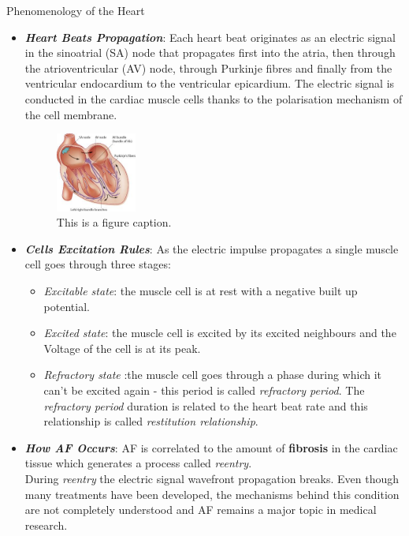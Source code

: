 \documentclass[final,hyperref={pdfpagelabels=false}]{beamer}
\begin{document}
\begin{frame}[t]
\begin{columns}[t]
\begin{column}{.465\textwidth}
\begin{block}{Phenomenology of the Heart}
	\begin{itemize}
	\item \textbf{\textit{Heart Beats Propagation}}: Each heart beat originates as an electric signal in the sinoatrial (SA) node that propagates first into the atria, then through the atrioventricular (AV) node, through Purkinje fibres 		and finally from the ventricular endocardium to the ventricular epicardium. The electric signal is conducted in the cardiac muscle cells thanks to the polarisation mechanism of the cell membrane. 

\begin{figure}
\centering
\includegraphics[width=0.25\textwidth]{heart}
\caption{\label{fig:frog1}This is a figure caption.}
\end{figure}


	\item \textbf{ \textit{Cells Excitation Rules}}: As the electric impulse propagates a single muscle cell goes through three stages:

		\begin{itemize}
 		 \item \textit{Excitable state}: the muscle cell is at rest with a negative built up potential.
  										
  		\item \textit{Excited state}: the muscle cell is excited by its excited neighbours and the Voltage of the cell is at its peak. 
  		\item \textit{Refractory state} :the muscle cell goes through a phase during which it can't be excited again - this period is called \textit{refractory period}. The \textit{refractory period} duration is related to the heart beat rate and this relationship is called \textit{restitution relationship}.
		\end{itemize}  





	\item \textbf{\textit{ How AF Occurs}}: AF is correlated to the amount of \textbf{ fibrosis} in the cardiac tissue which generates a process called \textit{ reentry}. \\
	During \textit{ reentry} the electric signal wavefront propagation breaks. 
	Even though many treatments have been developed, the mechanisms behind this condition are not completely understood and AF remains a major topic in medical research. \\



\end{itemize}
\end{block}
\end{column}
\end{columns}
\end{frame}
\end{document}
